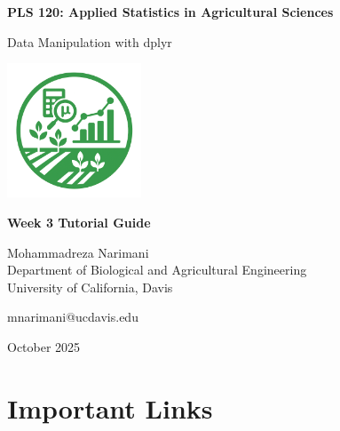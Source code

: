 \documentclass[11pt,a4paper]{article}
\begin{document}
\begin{titlepage}
    \centering
    \vspace*{2cm}
    
    {\Huge\bfseries\color{primarygreen} PLS 120: Applied Statistics in Agricultural Sciences}
    
    \vspace{1cm}
    
    {\Large\color{primarygreen} Data Manipulation with dplyr}
    
    \vspace{2cm}
    
    \includegraphics[width=0.3\textwidth]{../../images/logos/Home_Page_Logo.png}
    
    \vspace{2cm}
    
    {\large\bfseries Week 3 Tutorial Guide}
    
    \vspace{1cm}
    
    {\large Mohammadreza Narimani}\\
    {\normalsize Department of Biological and Agricultural Engineering}\\
    {\normalsize University of California, Davis}
    
    \vspace{1cm}
    
    {\normalsize mnarimani@ucdavis.edu}
    
    \vfill
    
    {\normalsize October 2025}
\end{titlepage}

\tableofcontents
\newpage

\section{Important Links}
\end{document}
